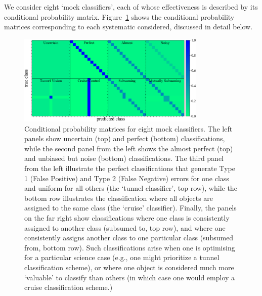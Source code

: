 We consider eight `mock classifiers', each of whose effectiveness is described by its conditional probability matrix.
Figure~\ref{fig:mock_cm} shows the conditional probability matrices corresponding to each systematic considered, discussed in detail below.
\begin{figure}
	\begin{center}
    \includegraphics[width=0.8\textwidth]{./fig/all_sim_cm.png}
		\caption{Conditional probability matrices for eight mock classifiers. The left panels show uncertain (top) and perfect (bottom) classifications, while the second panel from the left shows the almost perfect (top) and unbiased but noise (bottom) classifications. The third panel from the left illustrate the perfect classifications that generate Type 1 (False Positive) and Type 2 (False Negative) errors for one class and uniform for all others (the `tunnel classifier', top row), while the bottom row illustrates the classification where all objects are assigned to the same class (the `cruise' classifier). Finally, the panels on the far right show classifications where one class is consistently assigned to another class (subsumed to, top row), and where one consistently assigns another class to one particular class (subsumed from, bottom row). Such classifications arise when one is optimising for a particular science case (e.g., one might prioritize a tunnel classification scheme), or where one object is considered much more `valuable' to classify than others (in which case one would employ a cruise classification scheme.)
		\label{fig:mock_cm}}
	\end{center}
\end{figure}

